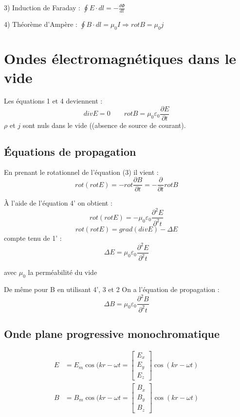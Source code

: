 \documentclass[12pt,a4paper]{report}
\begin{document}
3) Induction de Faraday : \(\oint E \cdot dl = - \frac{d \Phi}{dt}\)

4) Théorème d'Ampère : \(\oint B \cdot dl = \mu_0I \Rightarrow rot B = \mu_0 j\)

\section{Ondes électromagnétiques dans le vide}

Les équations 1 et 4 deviennent :
\[
	div E = 0 \quad \quad rot B = \mu_0 \varepsilon_0 \dfrac{\partial E}{\partial t}
\]
\(\rho\) et \(j\) sont nuls dans le vide ((absence de source de courant).

\subsection{Équations de propagation}

En prenant le rotationnel de l'équation (3) il vient :
\[
	rot (rot E) = - rot \dfrac{\partial B}{\partial t} = - \dfrac{\partial}{\partial t} rot B
\]

À l'aide de l'équation 4' on obtient :
\[
	rot (rot E) = - \mu_0 \varepsilon_0 \dfrac{\partial^2 E}{\partial^2 t}
\]
\[
	rot (rot E) = grad (div E) - \Delta E
\]
compte tenu de 1' :
\[
	\Delta E = \mu_0 \varepsilon_0 \dfrac{\partial^2 E}{\partial^2 t}
\]

avec \(\mu_0\) la perméabilité du vide

De même pour B en utilisant 4', 3 et 2
On a l'équation de propagation :
\[
	\Delta B = \mu_0 \varepsilon_0 \dfrac{\partial^2 B}{\partial^2 t}
\]

\subsection{Onde plane progressive monochromatique}

\begin{align}
    E &= E_m \cos(kr - \omega t = \begin{bmatrix}
           E_x \\
           E_y \\
           E_z
         \end{bmatrix} \cos (kr- \omega t)\\         
    B &= B_m \cos(kr - \omega t = \begin{bmatrix}
           B_x \\
           B_y \\
           B_z
         \end{bmatrix} \cos (kr- \omega t)
  \end{align}
\end{document}

